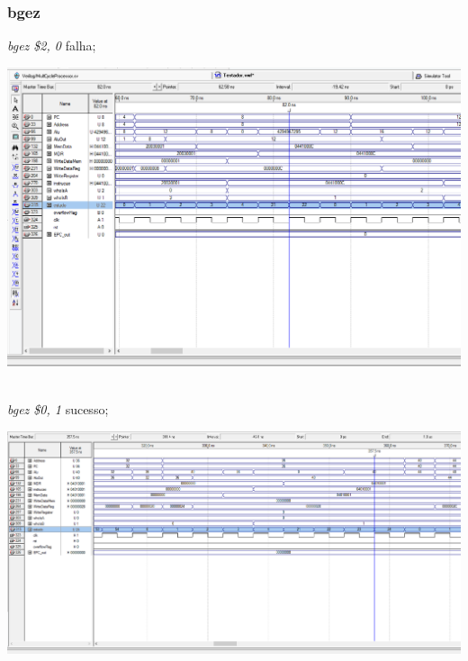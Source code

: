 \documentclass{article}
\begin{document}
    \subsubsection{bgez}
    {\it bgez \$2, 0} falha;\\
    \begin{center}
        \includegraphics[scale=0.25]{bgezfalha.PNG}
    \end{center}
    \\
    \newpage
    {\it bgez \$0, 1} sucesso;\\
    \begin{center}
        \includegraphics[scale=0.25]{bgezsucesso.PNG}
    \end{center}
    
    \\
\end{document}
